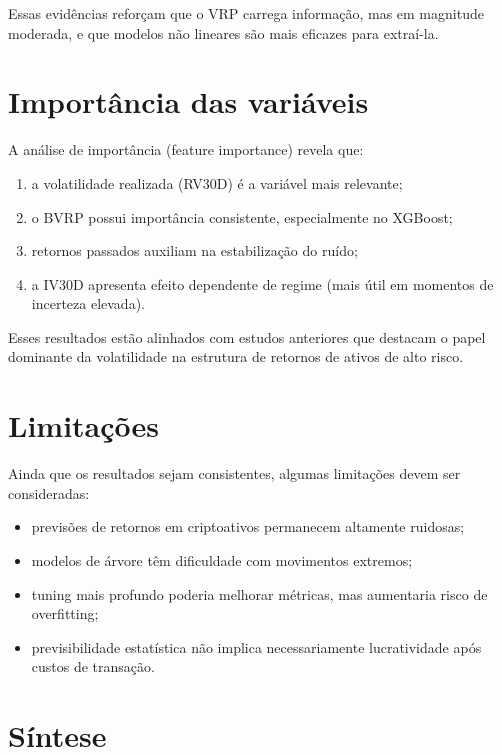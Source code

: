 Essas evidências reforçam que o VRP carrega informação, mas em magnitude moderada,
e que modelos não lineares são mais eficazes para extraí-la.

\section{Importância das variáveis}

A análise de importância (feature importance) revela que:

\begin{enumerate}
    \item a volatilidade realizada (RV30D) é a variável mais relevante;
    \item o BVRP possui importância consistente, especialmente no XGBoost;
    \item retornos passados auxiliam na estabilização do ruído;
    \item a IV30D apresenta efeito dependente de regime (mais útil em momentos de
          incerteza elevada).
\end{enumerate}

Esses resultados estão alinhados com estudos anteriores que destacam o papel
dominante da volatilidade na estrutura de retornos de ativos de alto risco.

\section{Limitações}

Ainda que os resultados sejam consistentes, algumas limitações devem ser
consideradas:

\begin{itemize}
    \item previsões de retornos em criptoativos permanecem altamente ruidosas;
    \item modelos de árvore têm dificuldade com movimentos extremos;
    \item tuning mais profundo poderia melhorar métricas, mas aumentaria risco de
          overfitting;
    \item previsibilidade estatística não implica necessariamente lucratividade
          após custos de transação.
\end{itemize}

\section{Síntese}

